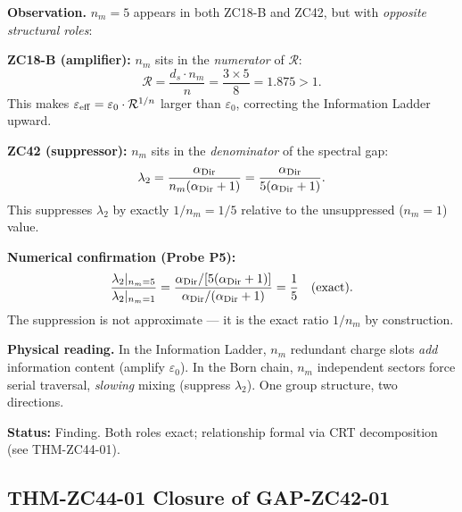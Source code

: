 \documentclass[12pt, a4paper]{article}
\providecommand{\eps}{\varepsilon_0}
\providecommand{\ltwo}{\lambda_2}
\providecommand{\nm}{n_m}
\providecommand{\ds}{d_s}
\providecommand{\alphDir}{\alpha_{\rm Dir}}
\providecommand{\Rcal}{\mathcal{R}}
\providecommand{\epseff}{\varepsilon_{\rm eff}}
\begin{document}
\begin{derivedbox}[title={FIND-ZC44-02: $n_m$ Acts as
  Amplifier in ZC18-B and Suppressor in ZC42 (Exact)}]
\textbf{Observation.}
$\nm = 5$ appears in both ZC18-B and ZC42, but with
\emph{opposite structural roles}:

\medskip
\textbf{ZC18-B (amplifier):}
$\nm$ sits in the \emph{numerator} of $\Rcal$:
\[
  \Rcal = \frac{\ds \cdot \nm}{n} = \frac{3\times 5}{8}
  = 1.875 > 1.
\]
This makes $\epseff = \eps\cdot\Rcal^{1/n}$ larger than
$\eps$, correcting the Information Ladder upward.

\medskip
\textbf{ZC42 (suppressor):}
$\nm$ sits in the \emph{denominator} of the spectral gap:
\[
  \ltwo = \frac{\alphDir}{\nm(\alphDir+1)}
  = \frac{\alphDir}{5(\alphDir+1)}.
\]
This suppresses $\ltwo$ by exactly $1/\nm = 1/5$
relative to the unsuppressed ($\nm = 1$) value.

\medskip
\textbf{Numerical confirmation (Probe P5):}
\[
  \frac{\ltwo|_{\nm=5}}{\ltwo|_{\nm=1}}
  = \frac{\alphDir/[5(\alphDir+1)]}{\alphDir/(\alphDir+1)}
  = \frac{1}{5} \quad\text{(exact)}.
\]
The suppression is not approximate --- it is the exact
ratio $1/\nm$ by construction.

\textbf{Physical reading.}
In the Information Ladder, $\nm$ redundant charge slots
\emph{add} information content (amplify $\eps$).
In the Born chain, $\nm$ independent sectors force
serial traversal, \emph{slowing} mixing (suppress $\ltwo$).
One group structure, two directions.

\textbf{Status:} Finding. Both roles exact; relationship
formal via CRT decomposition (see THM-ZC44-01).
\end{derivedbox}

\subsection{THM-ZC44-01 \quad Closure of GAP-ZC42-01}

\end{document}
